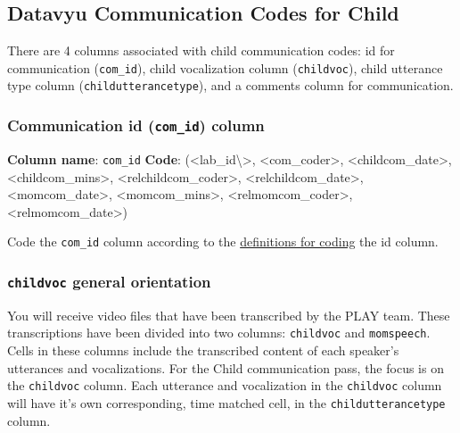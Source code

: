 \documentclass[
  12pt,
]{book}
\begin{document}
\hypertarget{datavyu-communication-codes-for-child}{%
\subsection*{Datavyu Communication Codes for Child}\label{datavyu-communication-codes-for-child}}

There are 4 columns associated with child communication codes: id for communication (\texttt{com\_id}), child vocalization column (\texttt{childvoc}), child utterance type column (\texttt{childutterancetype}), and a comments column for communication.

\hypertarget{communication-id-com_id-column}{%
\subsubsection*{\texorpdfstring{Communication id (\texttt{com\_id}) column}{Communication id (com\_id) column}}\label{communication-id-com_id-column}}

\textbf{Column name}: \texttt{com\_id}
\textbf{Code}: (\textless lab\_id\textbackslash\textgreater, \textless com\_coder\textgreater, \textless childcom\_date\textgreater, \textless childcom\_mins\textgreater, \textless relchildcom\_coder\textgreater, \textless relchildcom\_date\textgreater, \textless momcom\_date\textgreater, \textless momcom\_mins\textgreater, \textless relmomcom\_coder\textgreater, \textless relmomcom\_date\textgreater)

Code the \texttt{com\_id} column according to the \protect\hyperlink{id_col}{definitions for coding} the id column.

\hypertarget{childvoc-general-orientation}{%
\subsubsection*{\texorpdfstring{\texttt{childvoc} general orientation}{childvoc general orientation}}\label{childvoc-general-orientation}}

You will receive video files that have been transcribed by the PLAY team. These transcriptions have been divided into two columns: \texttt{childvoc} and \texttt{momspeech}. Cells in these columns include the transcribed content of each speaker's utterances and vocalizations. For the Child communication pass, the focus is on the \texttt{childvoc} column. Each utterance and vocalization in the \texttt{childvoc} column will have it's own corresponding, time matched cell, in the \texttt{childutterancetype} column.
\end{document}

